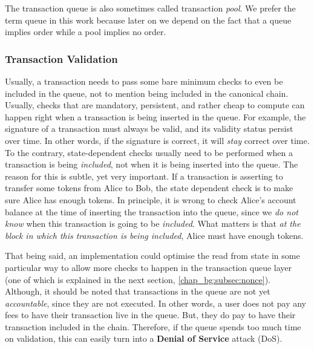 \begin{remark}
	The transaction queue is also sometimes called transaction \textit{pool}. We prefer the term
	queue in this work because later on we depend on the fact that a queue implies order while a
	pool implies no order.
\end{remark}

\subsubsection{Transaction Validation} \label{chap_bg:subsec:validation}

Usually, a transaction needs to pass some bare minimum checks to even be included in the queue, not
to mention being included in the canonical chain. Usually, checks that are mandatory, persistent,
and rather cheap to compute can happen right when a transaction is being inserted in the queue. For
example, the signature of a transaction must always be valid, and its validity status persist over
time. In other words, if the signature is correct, it will \textit{stay} correct over time. To the
contrary, state-dependent checks usually need to be performed when a transaction is being
\textit{included}, not when it is being inserted into the queue. The reason for this is subtle, yet
very important. If a transaction is asserting to transfer some tokens from Alice to Bob, the state
dependent check is to make sure Alice has enough tokens. In principle, it is wrong to check Alice's
account balance at the time of inserting the transaction into the queue, since we \textit{do not
know} when this transaction is going to be \textit{included}. What matters is that \textit{at the
block in which this transaction is being included}, Alice must have enough tokens.

That being said, an implementation could optimise the read from state in some particular way to
allow more checks to happen in the transaction queue layer (one of which is explained in the next
section, \ref{chap_bg:subsec:nonce}). Although, it should be noted that transactions in the queue
are not yet \textit{accountable}, since they are not executed. In other words, a user does not pay
any fees to have their transaction live in the queue. But, they do pay to have their transaction
included in the chain. Therefore, if the queue spends too much time on validation, this can easily
turn into a \textbf{Denial of Service} attack (DoS).


